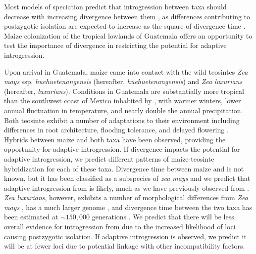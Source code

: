 Most models of speciation predict that introgression between taxa should decrease with increasing divergence between them \citep{harrison2014hybridization}, as differences contributing to postzygotic isolation are expected to increase as the square of divergence time \citep{orr2001evolution}. Maize colonization of the tropical lowlands of Guatemala offers an opportunity to test the importance of divergence in restricting the potential for adaptive introgression.

Upon arrival in Guatemala, maize came into contact with the wild teosintes  \emph{Zea mays} ssp. \emph{huehuetenangensis} (hereafter, \emph{huehuetenangensis}) and \emph{Zea luxurians} (hereafter, \emph{luxurians}). 
Conditions in Guatemala are substantially more tropical than the southwest coast of Mexico inhabited by \zp, with warmer winters, lower annual fluctuation in temperature, and nearly double the annual precipitation.
Both teosinte exhibit a number of adaptations to their environment including differences in root architecture, flooding tolerance, and delayed flowering \citep{wilkes1967teosinte, mano2006}.
Hybrids between maize and both taxa \citep{wilkes1967teosinte} have been observed, providing the opportunity for adaptive introgression.  
If divergence impacts the potential for adaptive introgression, we predict different patterns of maize-teosinte hybridization for each of these taxa. Divergence time between maize and \zh{} is not known, but it has been classified as a subspecies of \emph{zea mays} \citep{doebley1990systematics} and we predict that adaptive introgression from \zh{} is likely, much as we have previously observed from \zm{} \citep{Hufford2013}.
\emph{Zea luxurians}, however, exhibits a number of morphological differences from \emph{Zea mays} \citep{doebley1980taxonomy}, has a much larger genome \citep{tenaillon2011genome}, and divergence time between the two taxa has been estimated at $\sim150,000$ generations \citep{Ross-Ibarra2009a}. We predict that there will be less overall evidence for introgression from \zl{} due to the increased likelihood of loci causing postzygotic isolation.  
If adaptive introgression is observed, we predict it will be at fewer loci due to potential linkage with other incompatibility factors.


